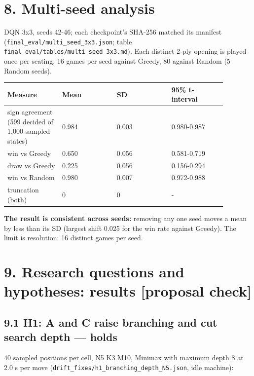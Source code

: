 \documentclass[11pt]{article}
\begin{document}
\section{8. Multi-seed analysis}

DQN 3x3, seeds 42-46; each checkpoint's SHA-256 matched its manifest (\texttt{final\_eval/multi\_seed\_3x3.json};
table \texttt{final\_eval/tables/multi\_seed\_3x3.md}). Each distinct 2-ply opening is played once per
seating: 16 games per seed against Greedy, 80 against Random (5 Random seeds).

\begin{center}\scriptsize
\begin{longtable}{p{0.22\linewidth}p{0.22\linewidth}p{0.22\linewidth}p{0.22\linewidth}}
\toprule
Measure & Mean & SD & 95\% t-interval \\
\midrule
sign agreement (599 decided of 1,000 sampled states) & 0.984 & 0.003 & 0.980-0.987 \\
win vs Greedy & 0.650 & 0.056 & 0.581-0.719 \\
draw vs Greedy & 0.225 & 0.056 & 0.156-0.294 \\
win vs Random & 0.980 & 0.007 & 0.972-0.988 \\
truncation (both) & 0 & 0 & - \\
\bottomrule
\end{longtable}
\end{center}

\textbf{The result is consistent across seeds:} removing any one seed moves a mean by less than its SD
(largest shift 0.025 for the win rate against Greedy). The limit is resolution: 16 distinct games
per seed.

\section{9. Research questions and hypotheses: results [proposal check]}

\subsection{9.1 H1: A and C raise branching and cut search depth — holds}

40 sampled positions per cell, N5 K3 M10, Minimax with maximum depth 8 at 2.0 s per move
(\texttt{drift\_fixes/h1\_branching\_depth\_N5.json}, idle machine):
\end{document}
